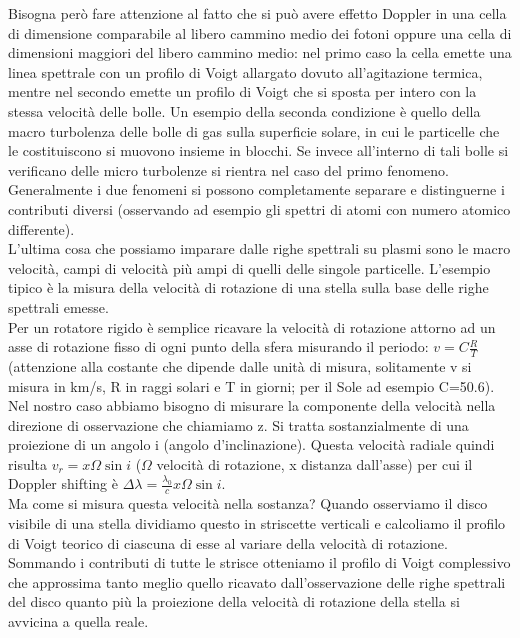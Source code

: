 \documentclass[a4paper,11pt]{article}
\begin{document}
Bisogna però fare attenzione al fatto che si può avere effetto Doppler in una cella di dimensione comparabile al libero cammino medio dei fotoni oppure una cella di dimensioni maggiori del libero cammino medio: nel primo caso la cella emette una linea spettrale con un profilo di Voigt allargato dovuto all’agitazione termica, mentre nel secondo emette un profilo di Voigt che si sposta per intero con la stessa velocità delle bolle. Un esempio della seconda condizione è quello della macro turbolenza delle bolle di gas sulla superficie solare, in cui le particelle che le costituiscono si muovono insieme in blocchi. Se invece all’interno di tali bolle si verificano delle micro turbolenze si rientra nel caso del primo fenomeno.
Generalmente i due fenomeni si possono completamente separare e distinguerne i contributi diversi (osservando ad esempio gli spettri di atomi con numero atomico differente).\\
L’ultima cosa che possiamo imparare dalle righe spettrali su plasmi sono le macro velocità, campi di velocità più ampi di quelli delle singole particelle. L’esempio tipico è la misura della velocità di rotazione di una stella sulla base delle righe spettrali emesse.\\
Per un rotatore rigido è semplice ricavare la velocità di rotazione attorno ad un asse di rotazione fisso di ogni punto della sfera misurando il periodo: \begin{math} v=C\frac{R}{T} \end{math} (attenzione alla costante che dipende dalle unità di misura, solitamente v si misura in km/s, R in raggi solari e T in giorni; per il Sole ad esempio C=50.6).\\
Nel nostro caso abbiamo bisogno di misurare la  componente della velocità nella direzione di osservazione che chiamiamo z. Si tratta sostanzialmente di una proiezione di un angolo i (angolo d’inclinazione).  Questa velocità radiale quindi risulta \begin{math}
    v_r=x\Omega \sin{i}\end{math} (\begin{math}
\Omega\end{math} velocità di rotazione, x distanza dall'asse)
 per cui il Doppler shifting è \begin{math}
    \Delta \lambda=\frac{\lambda_0}{c}x\Omega \sin{i}
\end{math}.\\
Ma come si misura questa velocità nella sostanza? Quando osserviamo il disco visibile di una stella dividiamo questo in striscette verticali e calcoliamo il profilo di Voigt teorico di ciascuna di esse al variare della velocità di rotazione. Sommando i contributi di tutte le strisce otteniamo il profilo di Voigt complessivo che approssima tanto meglio quello ricavato dall'osservazione delle righe spettrali del disco quanto più la proiezione della velocità di rotazione della stella si avvicina a quella reale.
\end{document}
